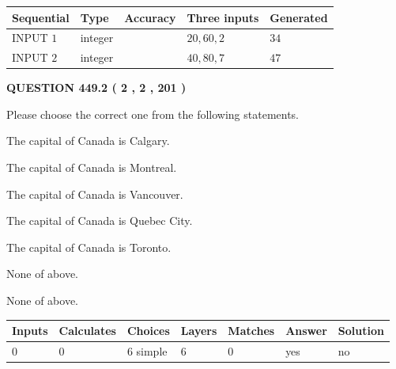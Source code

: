 \documentclass[12pt]{article}
\begin{document}
  
\noindent\begin{tabular}{|l|l|l|l|l|}
\hline
 Sequential & Type & Accuracy & Three inputs & Generated \\ 
\hline
 
 
  INPUT $  1 $ & integer &  & $
 20
 , 
 60
 , 
 2
 $ & $ 34 $ 
 \\  \hline  
 
 
  INPUT $  2 $ & integer &  & $
 40
 , 
 80
 , 
 7
 $ & $ 47 $ 
 \\  \hline  
 \end{tabular}
   
   
  
\vspace{0.2in}
  
{\textbf{\Large{QUESTION
449.2 
 ( 2 , 2 , 201 )
}}}
  
  
Please choose the correct one from the following statements.
 
 
The capital of Canada is Calgary.
 
 
The capital of Canada is Montreal.
 
 
The capital of Canada is Vancouver.
 
 
The capital of Canada is Quebec City.
 
 
The capital of Canada is Toronto.
 
 
 None of above.
 
 
\noindent{}
 
 
 None of above.
 
 
\noindent{}
 
 
   
   
   
   
\noindent\begin{tabular}{|l|l|l|l|l|l|l|}
 \hline
Inputs & Calculates & Choices & Layers & Matches & Answer & Solution \\ \hline
 0  & 
 0  & 
 6
  simple  
  & 
 6  & 
 0  & 
  yes & 
  no 
  \\ \hline
 \end{tabular}
   
   
   
\end{document}
